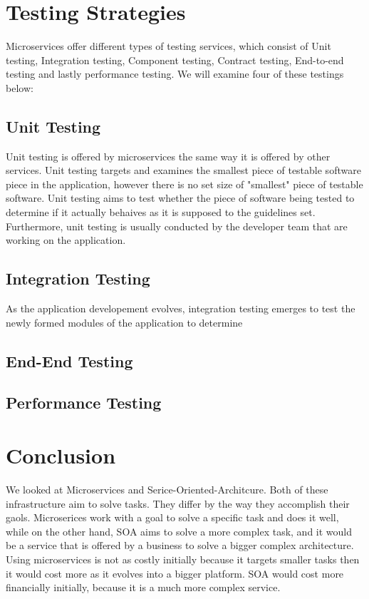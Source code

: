 \documentclass{IEEEtran}
\begin{document}
	\section{Testing Strategies}
		Microservices offer different types of testing services, which consist of Unit testing, Integration testing, Component testing, Contract testing, End-to-end testing and lastly performance testing. We will examine four of these testings below: 
		\newline
		\subsection{Unit Testing}
			Unit testing is offered by microservices the same way it is offered by other services. Unit testing targets and examines the smallest piece of testable software piece in the application, however there is no set size of "smallest" piece of testable software. Unit testing aims to test whether the piece of software being tested to determine if it actually behaives as it is supposed to the guidelines set. Furthermore, unit testing is usually conducted by the developer team that are working on the application. 
			\newline

		\subsection{Integration Testing}
			As the application developement evolves, integration testing emerges to test the newly formed modules of the application to determine 
			\newline

		\subsection{End-End Testing}

			\newline

		\subsection{Performance Testing}

			\newline

	\section{Conclusion}
		We looked at Microservices and Serice-Oriented-Architcure. Both of these infrastructure aim to solve tasks. They differ by the way they accomplish their gaols. Microserices work with a goal to solve a specific task and does it well, while on the other hand, SOA aims to solve a more complex task, and it would be a service that is offered by a business to solve a bigger complex architecture. Using microservices is not as costly initially because it targets smaller tasks then it would cost more as it evolves into a bigger platform. SOA would cost more financially initially, because it is a much more complex service. 
\end{document}
